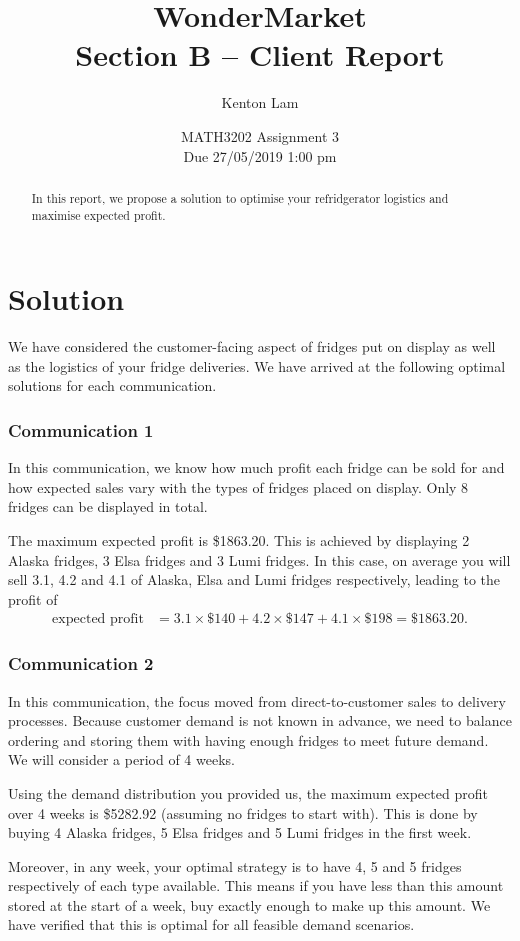 \documentclass[11pt,a4paper]{article}
\author{Kenton Lam}
\date{{MATH3202 Assignment 3 \\ Due 27/05/2019 1:00 pm}}
\title{WonderMarket \\ 
Section B -- Client Report}
\begin{document}
\maketitle
\begin{abstract}
    In this report, we propose a solution to optimise your refridgerator logistics 
    and maximise expected profit. 
\end{abstract}

\part{Solution}
We have considered the customer-facing aspect of fridges put on display 
as well as the logistics of your fridge deliveries. We have arrived at the 
following optimal solutions for each communication.

\section{Communication 1}
In this communication, we know how much profit each fridge can be sold for
and how expected sales vary with the types of fridges placed on display.
Only 8 fridges can be displayed in total.

The maximum expected profit is \$1863.20. This is achieved by displaying 
2 Alaska fridges, 3 Elsa fridges and 3 Lumi fridges. 
In this case, on average you will sell 3.1, 4.2 and 4.1 of Alaska, Elsa and 
Lumi fridges respectively, leading to the profit of 
\begin{align*}
    \text{expected profit} &= 3.1\times \$140+4.2\times\$147+4.1\times \$198 = \$1863.20.
\end{align*}



\section{Communication 2}
In this communication, the focus moved from direct-to-customer sales to delivery
processes. Because customer demand is not known in advance, we need to 
balance ordering and storing them with having enough fridges to meet 
future demand. We will consider a period of 4 weeks.

Using the demand distribution you provided us, the maximum expected profit 
over 4 weeks is \$5282.92 (assuming no fridges to start with). This is done by buying 
4 Alaska fridges, 5 Elsa fridges and 5 Lumi fridges in the first week.

Moreover, in any week, your optimal strategy is 
to have 4, 5 and 5 fridges respectively of each type available.
This means if you have less than this amount stored at the start of a 
week, buy exactly enough to make up this amount. We have verified that 
this is optimal for all feasible demand scenarios.
\end{document}
